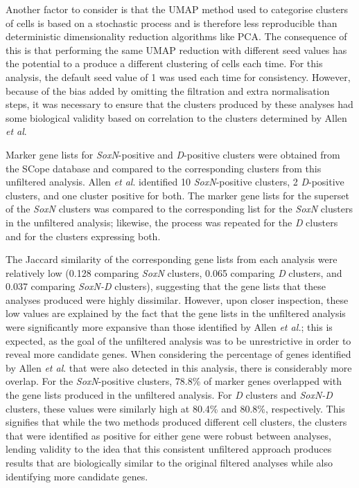 \documentclass[withindex,glossary]{cam-thesis}
\begin{document}
Another factor to consider is that the UMAP method used to categorise clusters of cells is based on a stochastic process and is therefore less reproducible than deterministic dimensionality reduction algorithms like PCA. The consequence of this is that performing the same UMAP reduction with different seed values has the potential to a produce a different clustering of cells each time. For this analysis, the default seed value of 1 was used each time for consistency. However, because of the bias added by omitting the filtration and extra normalisation steps, it was necessary to ensure that the clusters produced by these analyses had some biological validity based on correlation to the clusters determined by Allen \emph{et al}.

Marker gene lists for \emph{SoxN}-positive and \emph{D}-positive clusters were obtained from the SCope database  and compared to the corresponding clusters from this unfiltered analysis. Allen \emph{et al}. identified 10 \emph{SoxN}-positive clusters, 2 \emph{D}-positive clusters, and one cluster positive for both. The marker gene lists for the superset of the \emph{SoxN} clusters was compared to the corresponding list for the \emph{SoxN} clusters in the unfiltered analysis; likewise, the process was repeated for the \emph{D} clusters and for the clusters expressing both.

The Jaccard similarity of the corresponding gene lists from each analysis were relatively low (0.128 comparing \emph{SoxN} clusters, 0.065 comparing \emph{D} clusters, and 0.037 comparing \emph{SoxN-D} clusters), suggesting that the gene lists that these analyses produced were highly dissimilar. However, upon closer inspection, these low values are explained by the fact that the gene lists in the unfiltered analysis were significantly more expansive than those identified by Allen \emph{et al.}; this is expected, as the goal of the unfiltered analysis was to be unrestrictive in order to reveal more candidate genes. When considering the percentage of genes identified by Allen \emph{et al}. that were also detected in this analysis, there is considerably more overlap. For the \emph{SoxN}-positive clusters, 78.8\% of marker genes overlapped with the gene lists produced in the unfiltered analysis. For \emph{D} clusters and \emph{SoxN-D} clusters, these values were similarly high at 80.4\% and 80.8\%, respectively. This signifies that while the two methods produced different cell clusters, the clusters that were identified as positive for either gene were robust between analyses, lending validity to the idea that this consistent unfiltered approach produces results that are biologically similar to the original filtered analyses while also identifying more candidate genes.
\end{document}
